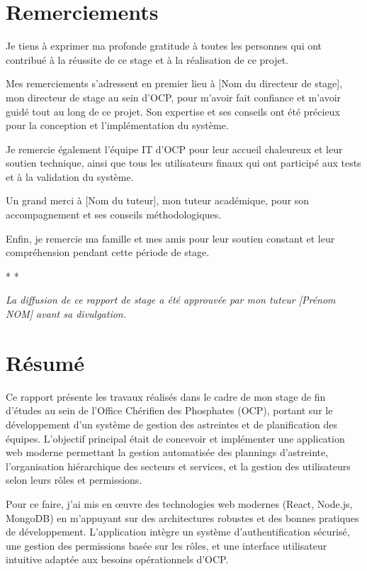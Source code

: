 \documentclass[11pt]{memoir}
\begin{document}
\setcounter{secnumdepth}{3}
\thispagestyle{empty}



\chapter*{Remerciements}
Je tiens à exprimer ma profonde gratitude à toutes les personnes qui ont contribué à la réussite de ce stage et à la réalisation de ce projet.

Mes remerciements s'adressent en premier lieu à [Nom du directeur de stage], mon directeur de stage au sein d'OCP, pour m'avoir fait confiance et m'avoir guidé tout au long de ce projet. Son expertise et ses conseils ont été précieux pour la conception et l'implémentation du système.

Je remercie également l'équipe IT d'OCP pour leur accueil chaleureux et leur soutien technique, ainsi que tous les utilisateurs finaux qui ont participé aux tests et à la validation du système.

Un grand merci à [Nom du tuteur], mon tuteur académique, pour son accompagnement et ses conseils méthodologiques.

Enfin, je remercie ma famille et mes amis pour leur soutien constant et leur compréhension pendant cette période de stage.

\bigskip
\begin{center}
    \Huge * * *
\end{center}
\bigskip
\textit{La diffusion de ce rapport de stage a été approuvée par mon tuteur [Prénom NOM] avant sa divulgation.}
\newpage

\chapter*{Résumé}
Ce rapport présente les travaux réalisés dans le cadre de mon stage de fin d'études au sein de l'Office Chérifien des Phosphates (OCP), portant sur le développement d'un système de gestion des astreintes et de planification des équipes. L'objectif principal était de concevoir et implémenter une application web moderne permettant la gestion automatisée des plannings d'astreinte, l'organisation hiérarchique des secteurs et services, et la gestion des utilisateurs selon leurs rôles et permissions.

Pour ce faire, j'ai mis en œuvre des technologies web modernes (React, Node.js, MongoDB) en m'appuyant sur des architectures robustes et des bonnes pratiques de développement. L'application intègre un système d'authentification sécurisé, une gestion des permissions basée sur les rôles, et une interface utilisateur intuitive adaptée aux besoins opérationnels d'OCP.
\end{document}
